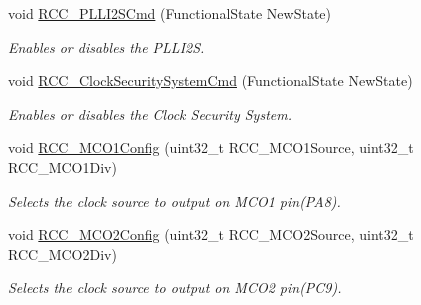 \begin{DoxyCompactItemize}
void \hyperlink{group___r_c_c___group1_ga2efe493a6337d5e0034bfcdfb0f541e4}{R\-C\-C\-\_\-\-P\-L\-L\-I2\-S\-Cmd} (Functional\-State New\-State)
\begin{DoxyCompactList}\small\item\em Enables or disables the P\-L\-L\-I2\-S. \end{DoxyCompactList}\item 
void \hyperlink{group___r_c_c___group1_ga0ff1fd7b9a8a49cdda11b7d7261c3494}{R\-C\-C\-\_\-\-Clock\-Security\-System\-Cmd} (Functional\-State New\-State)
\begin{DoxyCompactList}\small\item\em Enables or disables the Clock Security System. \end{DoxyCompactList}\item 
void \hyperlink{group___r_c_c___group1_ga15c9ecb6ef015ed008cb28e5b7a50531}{R\-C\-C\-\_\-\-M\-C\-O1\-Config} (uint32\-\_\-t R\-C\-C\-\_\-\-M\-C\-O1\-Source, uint32\-\_\-t R\-C\-C\-\_\-\-M\-C\-O1\-Div)
\begin{DoxyCompactList}\small\item\em Selects the clock source to output on M\-C\-O1 pin(\-P\-A8). \end{DoxyCompactList}\item 
void \hyperlink{group___r_c_c___group1_gaf50f10675b747de60c739e44e5c22aee}{R\-C\-C\-\_\-\-M\-C\-O2\-Config} (uint32\-\_\-t R\-C\-C\-\_\-\-M\-C\-O2\-Source, uint32\-\_\-t R\-C\-C\-\_\-\-M\-C\-O2\-Div)
\begin{DoxyCompactList}\small\item\em Selects the clock source to output on M\-C\-O2 pin(\-P\-C9). \end{DoxyCompactList}\end{DoxyCompactItemize}


